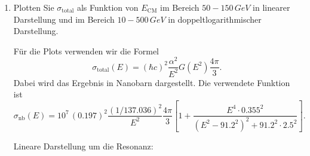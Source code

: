 \documentclass[11pt,a4paper]{scrartcl}
\begin{document}
\begin{enumerate}[label=(\alph*)]
            \begin{answerbox}
                Am Resonanzmaximum ergibt sich
                \[
                    \boxed{\sigma_{\mathrm{total}}=1.76\,\si{nanobarn}.}
                \]
                Ein Kreis mit gleicher Fläche hätte den Radius
                \[
                    \boxed{r=2.36\cdot10^{-4}\,\si{fm}=2.36\cdot10^{-19}\,\si{m}.}
                \]
            \end{answerbox}

        \item
            Plotten Sie $\sigma_{\mathrm{total}}$ als Funktion von $E_{\mathrm{CM}}$ im Bereich
            $50-150\,\si{GeV}$ in linearer Darstellung und im Bereich $10-500\,\si{GeV}$
            in doppeltlogarithmischer Darstellung.

            \begin{calculationbox}
                Für die Plots verwenden wir die Formel
                \[
                    \sigma_{\mathrm{total}}(E)
                    =(\hbar c)^2\frac{\alpha^2}{E^2}G(E^2)\frac{4\pi}{3}.
                \]
                Dabei wird das Ergebnis in Nanobarn dargestellt. Die verwendete Funktion ist
                \[
                    \sigma_{\mathrm{nb}}(E)
                    =10^7\,(0.197)^2\frac{(1/137.036)^2}{E^2}\frac{4\pi}{3}
                    \left[1+\frac{E^4\cdot0.355^2}{(E^2-91.2^2)^2+91.2^2\cdot2.5^2}\right].
                \]

                \begin{calculationbox}
                    Lineare Darstellung um die Resonanz:
                    \begin{center}
                    \end{center}
                \end{calculationbox}


\end{calculationbox}
\end{enumerate}
\end{document}
